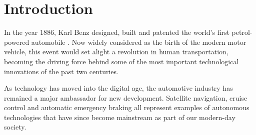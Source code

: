 \documentclass[conference]{IEEEtran}
\begin{document}




%
\IEEEpeerreviewmaketitle


\section{Introduction}

In the year 1886, Karl Benz designed, built and patented the world's first petrol-powered automobile \cite{carl-benz}. Now widely considered as the birth of the modern motor vehicle, this event would set alight a revolution in human transportation, becoming the driving force behind some of the most important technological innovations of the past two centuries. 



As technology has moved into the digital age, the automotive industry has remained a major ambassador for new development. Satellite navigation, cruise control and automatic emergency braking all represent examples of autonomous technologies that have since become mainstream as part of our modern-day society. 
\end{document}
